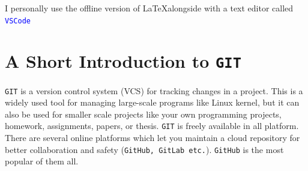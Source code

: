 \documentclass[a4paper, 12pt, one column]{article}
\begin{document}
\vspace{0.3cm}
 {
        {
        \begin{minipage}{0.9\textwidth}
            \centering
        I personally use the offline version of \LaTeX \space alongside with a text editor called \textcolor{blue}{ \texttt{VSCode}}
        \end{minipage}
        }
    }

\section{A Short Introduction to \texttt{GIT}}

\texttt{GIT} is a version control system (VCS) for tracking changes in a project. This is a widely used tool for managing large-scale programs like Linux kernel, but it can also be used for smaller scale projects like your own programming projects, homework, assignments, papers, or thesis. \texttt{GIT} is freely available in all platform. There are several online platforms which let you maintain a cloud repository for better collaboration and safety (\texttt{GitHub, GitLab etc.}). \texttt{GitHub} is the most popular of them all. 
\end{document}
